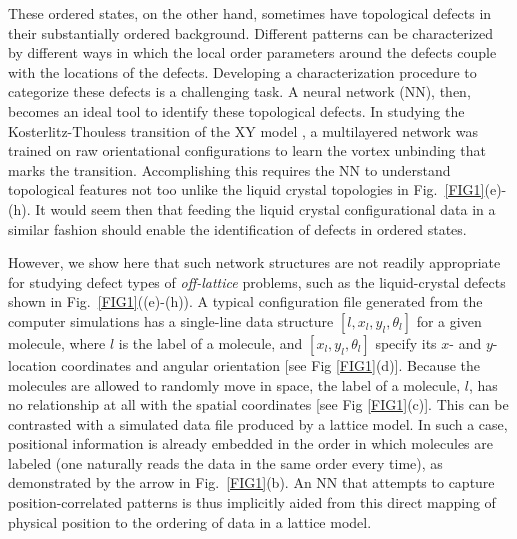 These ordered states, on the other hand, sometimes have topological defects in their substantially ordered background. Different patterns can be characterized by different ways in which the local order parameters around the defects couple with the locations of the defects. Developing a characterization procedure to categorize these defects is a challenging task. A neural network (NN), then, becomes an ideal tool to identify these topological defects.
%
In studying the Kosterlitz-Thouless transition of the XY model \cite{beach}, a multilayered  network was trained on raw orientational configurations to learn the vortex unbinding that marks the transition. Accomplishing this requires the NN to understand topological features not too unlike the liquid crystal topologies in Fig.\ \ref{FIG1}(e)-(h). It would seem then that feeding the liquid crystal configurational data in a similar fashion should enable the identification of defects in ordered states.

However, we show here that such network structures are not readily appropriate for studying defect types of {\emph{off-lattice}} problems, such as the liquid-crystal defects shown in Fig.\ \ref{FIG1}((e)-(h)).
A typical configuration file generated from the computer simulations has a single-line data structure $[l,x_l,y_l,\theta_l]$ for a given molecule, where $l$ is the label of a molecule, and $[x_l,y_l, \theta_l]$ specify its $x$- and $y$- location coordinates and angular orientation [see Fig \ref{FIG1}(d)].
Because the molecules are allowed to randomly move in space, the label of a molecule, $l$, has no relationship at all with the spatial coordinates [see Fig \ref{FIG1}(c)].
This can be contrasted with a simulated data file produced by a lattice model. In such a case, positional information is already embedded in the order in which molecules are labeled (one naturally reads the data in the same order every time), as demonstrated by the arrow in Fig.\ \ref{FIG1}(b).
An NN that attempts to capture position-correlated patterns is thus implicitly aided from this direct mapping of physical position to the ordering of data in a lattice model.

